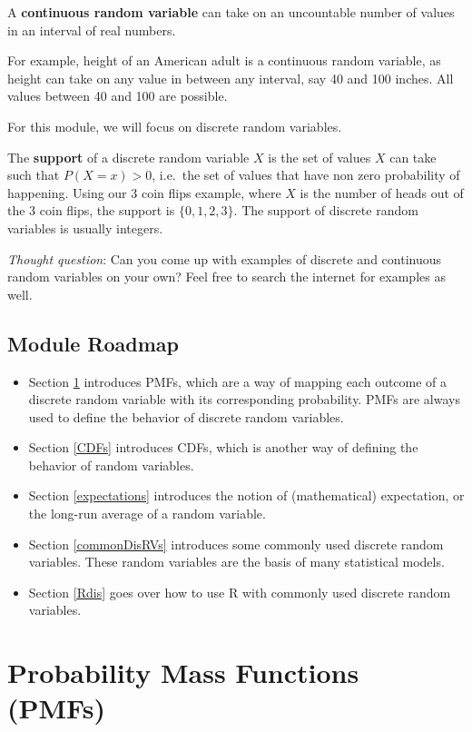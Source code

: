 \documentclass[
]{book}
\providecommand{\tightlist}{%
  \setlength{\itemsep}{0pt}\setlength{\parskip}{0pt}}
\begin{document}
A \textbf{continuous random variable} can take on an uncountable number of values in an interval of real numbers.

For example, height of an American adult is a continuous random variable, as height can take on any value in between any interval, say 40 and 100 inches. All values between 40 and 100 are possible.

For this module, we will focus on discrete random variables.

The \textbf{support} of a discrete random variable \(X\) is the set of values \(X\) can take such that \(P(X = x) > 0\), i.e.~the set of values that have non zero probability of happening. Using our 3 coin flips example, where \(X\) is the number of heads out of the 3 coin flips, the support is \(\{0,1,2,3 \}\). The support of discrete random variables is usually integers.

\emph{Thought question}: Can you come up with examples of discrete and continuous random variables on your own? Feel free to search the internet for examples as well.

\hypertarget{module-roadmap-1}{%
\subsection{Module Roadmap}\label{module-roadmap-1}}

\begin{itemize}
\tightlist
\item
  Section \ref{PMFs} introduces PMFs, which are a way of mapping each outcome of a discrete random variable with its corresponding probability. PMFs are always used to define the behavior of discrete random variables.
\item
  Section \ref{CDFs} introduces CDFs, which is another way of defining the behavior of random variables.
\item
  Section \ref{expectations} introduces the notion of (mathematical) expectation, or the long-run average of a random variable.
\item
  Section \ref{commonDisRVs} introduces some commonly used discrete random variables. These random variables are the basis of many statistical models.
\item
  Section \ref{Rdis} goes over how to use R with commonly used discrete random variables.
\end{itemize}

\hypertarget{PMFs}{%
\section{Probability Mass Functions (PMFs)}\label{PMFs}}
\end{document}
